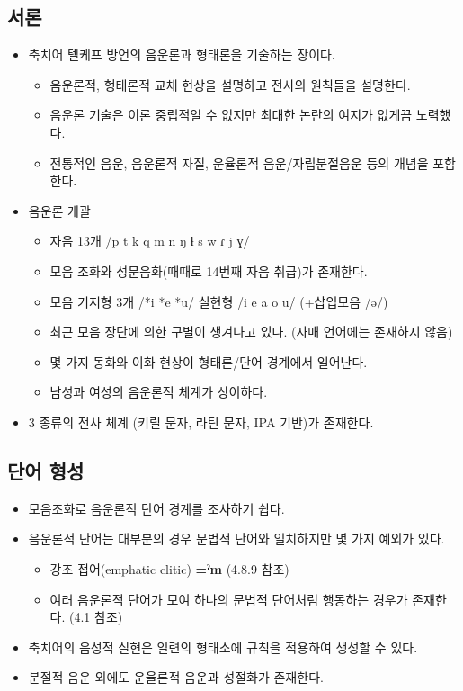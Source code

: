 \subsection{서론}
\begin{itemize}
\item 축치어 텔케프 방언의 음운론과 형태론을 기술하는 장이다.
\begin{itemize}
\item 음운론적, 형태론적 교체 현상을 설명하고 전사의 원칙들을 설명한다.
\item 음운론 기술은 이론 중립적일 수 없지만 최대한 논란의 여지가 없게끔 노력했다.
\item 전통적인 음운, 음운론적 자질, 운율론적 음운/자립분절음운 등의 개념을 포함한다. 
\end{itemize}
\item 음운론 개괄
\begin{itemize}
\item 자음 13개 /p t k q m n ŋ ɬ s w ɾ j ɣ/
\item 모음 조화와 성문음화(때때로 14번째 자음 취급)가 존재한다.
\item 모음 기저형 3개 /*i *e *u/ 실현형 /i e a o u/ (+삽입모음 /ə/)
\item 최근 모음 장단에 의한 구별이 생겨나고 있다. (자매 언어에는 존재하지 않음)
\item 몇 가지 동화와 이화 현상이 형태론/단어 경계에서 일어난다.
\item 남성과 여성의 음운론적 체계가 상이하다.
\end{itemize}
\item 3 종류의 전사 체계 (키릴 문자, 라틴 문자, IPA 기반)가 존재한다.
\end{itemize}

\subsection{단어 형성}
\begin{itemize}
\item 모음조화로 음운론적 단어 경계를 조사하기 쉽다.
\item 음운론적 단어는 대부분의 경우 문법적 단어와 일치하지만 몇 가지 예외가 있다.
\begin{itemize}
\item 강조 접어(emphatic clitic) \textbf{=ˀm} (4.8.9 참조)
\item 여러 음운론적 단어가 모여 하나의 문법적 단어처럼 행동하는 경우가 존재한다. (4.1 참조)
\end{itemize}
\item 축치어의 음성적 실현은 일련의 형태소에 규칙을 적용하여 생성할 수 있다.
\item 분절적 음운 외에도 운율론적 음운과 성절화가 존재한다.
\end{itemize}

